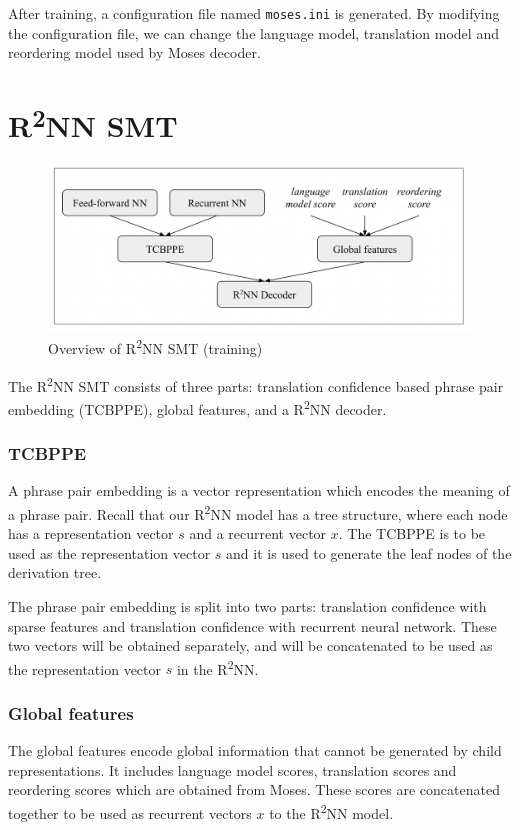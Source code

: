 \documentclass[12pt,a4paper,twoside,openright]{report}
\begin{document}
After training, a configuration file named \texttt{moses.ini} is generated. By modifying the configuration file, we can change the language model, translation model and reordering model used by Moses decoder.

\section{\texorpdfstring{R\textsuperscript{2}NN}{R2NN} SMT}

\begin{figure}[ht]
\centering
\includegraphics[width=1\textwidth]{images/r2nn_pipeline.png}
\caption{Overview of R\textsuperscript{2}NN SMT (training)}
\label{fig:r2nn_pipeline}
\end{figure}

The R\textsuperscript{2}NN SMT consists of three parts: translation confidence based phrase pair embedding (TCBPPE), global features, and a R\textsuperscript{2}NN decoder.

\subsubsection{TCBPPE}
A phrase pair embedding is a vector representation which encodes the meaning of a phrase pair. Recall that our R\textsuperscript{2}NN model has a tree structure, where each node has a representation vector $s$ and a recurrent vector $x$. The TCBPPE is to be used as the representation vector $s$ and it is used to generate the leaf nodes of the derivation tree. 

The phrase pair embedding is split into two parts: translation confidence with sparse features and translation confidence with recurrent neural network. These two vectors will be obtained separately, and will be concatenated to be used as the representation vector $s$ in the R\textsuperscript{2}NN.

\subsubsection{Global features}
The global features encode global information that cannot be generated by child representations. It includes language model scores, translation scores and reordering scores which are obtained from Moses. These scores are concatenated together to be used as recurrent vectors $x$ to the R\textsuperscript{2}NN model.
\end{document}
